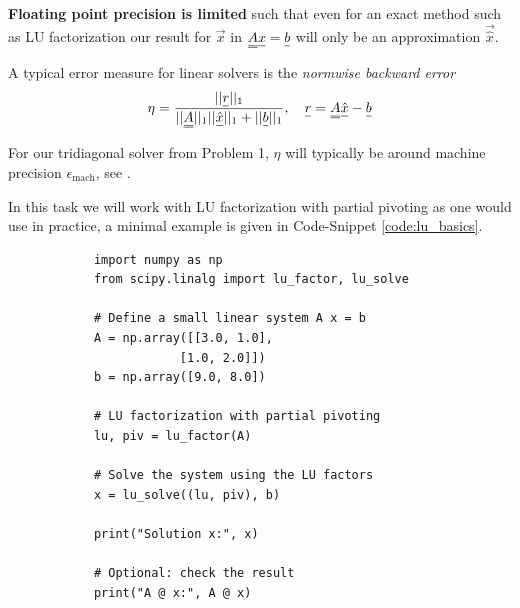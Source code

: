
    \textbf{Floating point precision is limited} such that even for an exact method 
    such as LU factorization our result for $\vec{x}$ in $\mat{A}\vec{x} = \vec{b}$
    will only be an approximation $\vec{\hat{x}}$.

    A typical error measure for linear solvers is the \textit{normwise backward error}
    \begin{equation}
        \eta = \frac{||\vec{r}||_1}{||\mat{A}||_1 ||\vec{\hat{x}}||_1 + ||\vec{b}||_1}, \quad \vec{r} = \mat{A}\vec{\hat{x}} - \vec{b}
    \end{equation}

    For our tridiagonal solver from Problem 1, $\eta$ will typically be 
    around machine precision $\epsilon_\text{mach}$, see \cite[Theorem 9.14]{higham02}.

    In this task we will work with LU factorization with partial pivoting as one
    would use in practice, a minimal example is given in Code-Snippet \ref{code:lu_basics}.

    \begin{codebox}
        \begin{verbatim}
            import numpy as np
            from scipy.linalg import lu_factor, lu_solve

            # Define a small linear system A x = b
            A = np.array([[3.0, 1.0],
                        [1.0, 2.0]])
            b = np.array([9.0, 8.0])

            # LU factorization with partial pivoting
            lu, piv = lu_factor(A)

            # Solve the system using the LU factors
            x = lu_solve((lu, piv), b)

            print("Solution x:", x)

            # Optional: check the result
            print("A @ x:", A @ x)
        \end{verbatim}
        \caption{Basic LU solve in Python.}
        \label{code:lu_basics}
    \end{codebox}

